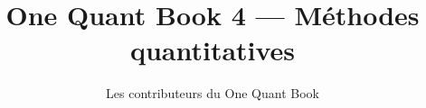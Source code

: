 \documentclass[11pt,a4paper,twoside,openany]{book}
\title{One Quant Book 4 --- Méthodes quantitatives}
\author{Les contributeurs du One Quant Book}
\date{\bookdate}
\begin{document}
\frontmatter



\tableofcontents

\mainmatter


\appendix
\part{\omsolutionspart}


\backmatter
\printindex
\end{document}
